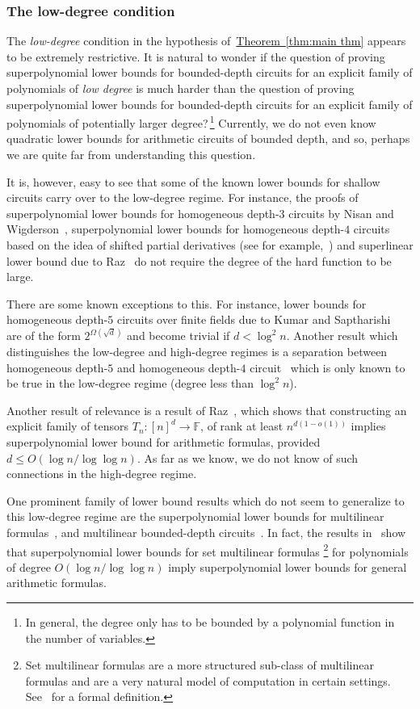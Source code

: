 \documentclass[11pt]{article}
\numberwithin{equation}{section}
\theoremstyle{definition}
\theoremstyle{plain}
\newcommand{\expref}[2]{\hyperref[#2]{#1~\ref{#2}}}
\newcommand{\F}{\mathbb{F}}
\begin{document}
\subsubsection{The low-degree condition}
The \emph{low-degree} condition in the hypothesis of~\expref{Theorem}{thm:main thm} appears to be extremely restrictive. It is natural to wonder if the question of proving superpolynomial lower bounds for
bounded-depth circuits for 
%
an explicit family of polynomials  %
of \emph{low degree}
is %
much harder than the question of proving
%
superpolynomial lower bounds for
%
bounded-depth      %
circuits for an explicit
%
family of polynomials  %
of potentially larger degree?\,\footnote{In general, the degree
only has to be %
%
bounded by a polynomial function in the number
of variables.} Currently, we do not even know quadratic lower bounds
for arithmetic circuits of bounded depth,
and so, perhaps we are quite far from understanding this question. 

It is, however, easy to see that some of the known lower bounds for
%
%
shallow  %
circuits
%
carry  %
over to the low-degree regime. For instance, the proofs of
%
superpolynomial   %
lower bounds for homogeneous depth-$3$ circuits by Nisan and Wigderson~\cite{nw1997},
%
superpolynomial   %
lower bounds for  homogeneous depth-$4$ circuits based on the idea of shifted partial derivatives (see for example,~\cite{GKKS14, KSS13, FLMS13, KS14}) and
%
superlinear      %
lower bound due to Raz~\cite{Raz10a} do not require the degree of the hard function to be large. 

There are some known exceptions to this. For instance, lower bounds for homogeneous depth-$5$ circuits over finite fields due to Kumar and Saptharishi~\cite{KumarSapth15} are of the form $2^{\Omega(\sqrt{d})}$ and become trivial if $d < \log^2 n$. Another result which distinguishes the low-degree and high-degree
%
regimes   %
is a separation between homogeneous depth-$5$ and homogeneous depth-$4$ circuit~\cite{KumarSapth15} which is only known to be true in the low-degree regime (degree less than $\log^2 n$).

Another result of relevance is a result of Raz~\cite{raz10}, which shows that constructing an explicit family of 
tensors $T_n:[n]^d \rightarrow \F$, of rank at least $n^{d(1-o(1))}$ implies
%
superpolynomial   %
lower bound for arithmetic formulas, provided $d \leq O(\log n/\log\log n)$. As far as we know, we do not know of such connections in the
%
high-degree regime.    %

One prominent family of lower bound results which do not seem to
generalize to this low-degree regime are the
%
superpolynomial   %
lower bounds for multilinear formulas~\cite{Raz06}, and multilinear
%
bounded-depth     %
circuits~\cite{raz-yehudayoff}. In fact, the results in~\cite{raz10} show that %
superpolynomial   %
lower bounds for set multilinear formulas%
\footnote{Set multilinear formulas are a more structured sub-class of multilinear formulas and are a very natural model of computation in certain settings. See~\cite{raz10} for a formal definition.}
%
%
%
for polynomials of degree %
$O(\log n/\log\log n)$
%
imply   %
%
superpolynomial   %
lower bounds for general arithmetic formulas. 
\end{document}
